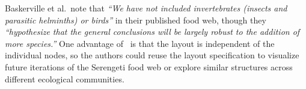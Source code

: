 Baskerville et al.\ note that \emph{``We have not included invertebrates
  (insects and parasitic helminths) or birds''} in their published food
web, though they \emph{``hypothesize that the general conclusions will be
  largely robust to the addition of more species.''} One advantage of
\projectname~is that the layout is independent of the individual nodes, so
the authors could reuse the layout specification to visualize future iterations
of the Serengeti food web or explore similar structures across different
ecological communities.
